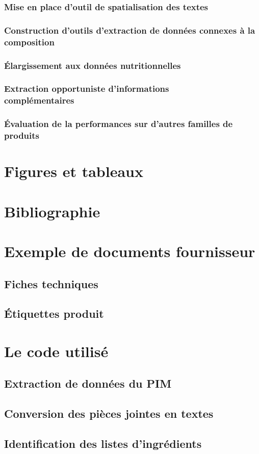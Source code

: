 \documentclass{report}
\begin{document}
        \section{Mise en place d'outil de spatialisation des textes}
        \section{Construction d'outils d'extraction de données connexes à la composition}
        \section{\'{E}largissement aux données nutritionnelles}
        \section{Extraction \og opportuniste \fg d'informations \\ complémentaires}
        \section{\'{E}valuation de la performances sur d'autres familles de produits}


\appendix
\part{Figures et tableaux}
    \listoftables
    \listoffigures
\part{Bibliographie}
    
    
\part{Exemple de documents fournisseur}
    \chapter{Fiches techniques}
    \chapter{\'{E}tiquettes produit}
\part{Le code utilisé}
    \chapter{Extraction de données du PIM}
    \chapter{Conversion des pièces jointes en textes}
    \chapter{Identification des listes d'ingrédients}
\end{document}
